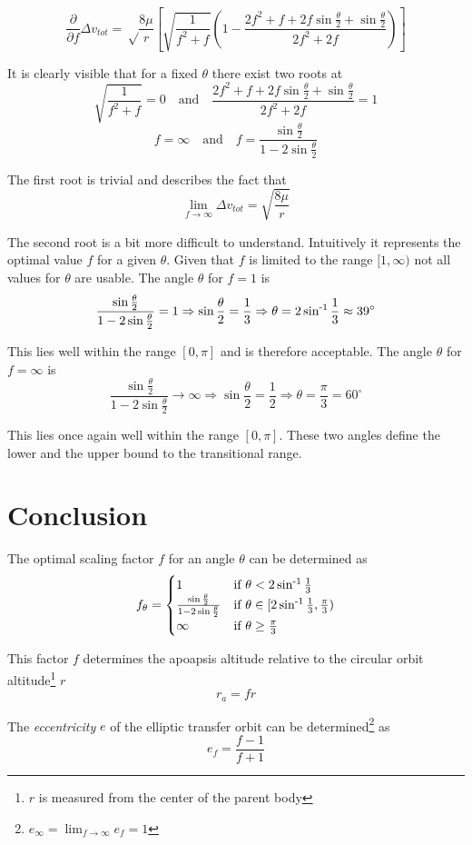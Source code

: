 \documentclass[a4paper, 11pt]{article}
\begin{document}
$$\frac{\partial}{\partial f}\Delta v_{tot}
= \sqrt\frac{8\mu}{r} \left[ \sqrt{\frac{1}{f^2+f}} \left(1- \frac{2f^2+f+2f\sin\frac\theta 2 + \sin\frac\theta 2}{2f^2+2f} \right)\right]
$$

It is clearly visible that for a fixed $\theta$ there exist two roots at
$$\sqrt{\frac{1}{f^2+f}} = 0 \quad\text{and}\quad  \frac{2f^2+f+2f\sin\frac\theta 2 + \sin\frac\theta 2}{2f^2+2f} =1$$
$$f = \infty \quad \text{and} \quad f = \frac{\sin\frac\theta 2}{1-2\sin\frac\theta 2}$$

The first root is trivial and describes the fact that
$$\lim_{f\to\infty}\Delta v_{tot} = \sqrt{\frac{8\mu}{r}}$$

The second root is a bit more difficult to understand. Intuitively it represents the optimal value $f$ for a given $\theta$.
Given that $f$ is limited to the range $[1,\infty)$ not all values for $\theta$ are usable.
The angle $\theta$ for $f=1$ is
$$\frac{\sin\frac\theta 2}{1-2\sin\frac\theta 2} = 1 \Rightarrow \sin\frac\theta 2 = \frac13 \Rightarrow \theta = 2\sin^{\text-1}\frac13 \approx 39^\circ$$

This lies well within the range $[0,\pi]$ and is therefore acceptable. The angle $\theta$ for $f=\infty$ is
$$\frac{\sin\frac\theta 2}{1-2\sin\frac\theta 2} \to \infty \Rightarrow \sin\frac\theta2 = \frac12 \Rightarrow \theta = \frac\pi3=60^\circ $$

This lies once again well within the range $[0,\pi]$. These two angles define the lower and the upper bound to the transitional range.

\section{Conclusion}
The optimal scaling factor $f$ for an angle $\theta$ can be determined as
$$
f_\theta = \begin{cases}
1 & \text{if } \theta < 2\sin^{\text-1}\frac13\\
\frac{\sin\frac\theta 2}{1-2\sin\frac\theta 2} & \text{if } \theta \in [2\sin^{\text-1}\frac13,\frac\pi3)\\
\infty & \text{if } \theta \geq \frac\pi3
\end{cases}$$

This factor $f$ determines the apoapsis altitude relative to the circular orbit altitude\footnote{$r$ is measured from the center of the parent body} $r$
$$r_a = fr$$

The \emph{eccentricity} $e$ of the elliptic transfer orbit can be determined\footnote{$e_\infty = \lim_{f\to\infty}e_f = 1$} as
$$e_f = \frac{f-1}{f+1}$$
\end{document}
